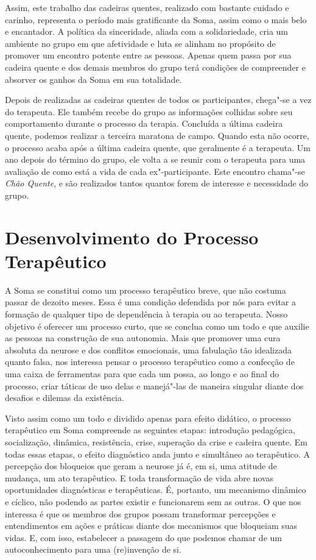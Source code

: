Assim, este trabalho das cadeiras quentes, realizado com bastante
cuidado e carinho, representa o período mais gratificante da Soma, assim
como o mais belo e encantador. A política da sinceridade, aliada com a
solidariedade, cria um ambiente no grupo em que afetividade e luta se
alinham no propósito de promover um encontro potente entre as pessoas.
Apenas quem passa por sua cadeira quente e dos demais membros do grupo
terá condições de compreender e absorver os ganhos da Soma em sua
totalidade.

Depois de realizadas as cadeiras quentes de todos os participantes,
chega"-se a vez do terapeuta. Ele também recebe do grupo as informações
colhidas sobre seu comportamento durante o processo da terapia.
Concluída a última cadeira quente, podemos realizar a terceira maratona
de campo. Quando esta não ocorre, o processo acaba após a última cadeira
quente, que geralmente é a terapeuta. Um ano depois do término do grupo,
ele volta a se reunir com o terapeuta para uma avaliação de como está a
vida de cada ex"-participante. Este encontro chama"-se \emph{Chão Quente},
e são realizados tantos quantos forem de interesse e necessidade do
grupo.

\section{Desenvolvimento do Processo Terapêutico}

A Soma se constitui como um processo terapêutico breve, que não costuma
passar de dezoito meses. Essa é uma condição defendida por nós para
evitar a formação de qualquer tipo de dependência à terapia ou ao
terapeuta. Nosso objetivo é oferecer um processo curto, que se conclua
como um todo e que auxilie as pessoas na construção de sua autonomia.
Mais que promover uma cura absoluta da neurose e dos conflitos
emocionais, uma fabulação tão idealizada quanto falsa, nos interessa
pensar o processo terapêutico como a confecção de uma caixa de
ferramentas para que cada um possa, ao longo e ao final do processo,
criar táticas de uso delas e manejá"-las de maneira singular diante dos
desafios e dilemas da existência.

Visto assim como um todo e dividido apenas para efeito didático, o
processo terapêutico em Soma compreende as seguintes etapas: introdução
pedagógica, socialização, dinâmica, resistência, crise, superação da
crise e cadeira quente. Em todas essas etapas, o efeito diagnóstico anda
junto e simultâneo ao terapêutico. A percepção dos bloqueios que geram a
neurose já é, em si, uma atitude de mudança, um ato terapêutico. E toda
transformação de vida abre novas oportunidades diagnósticas e
terapêuticas. É, portanto, um mecanismo dinâmico e cíclico, não podendo
as partes existir e funcionarem sem as outras. O que nos interessa é que
os membros dos grupos possam transformar percepções e entendimentos em
ações e práticas diante dos mecanismos que bloqueiam suas vidas. E, com
isso, estabelecer a passagem do que podemos chamar de um
autoconhecimento para uma (re)invenção de si.

